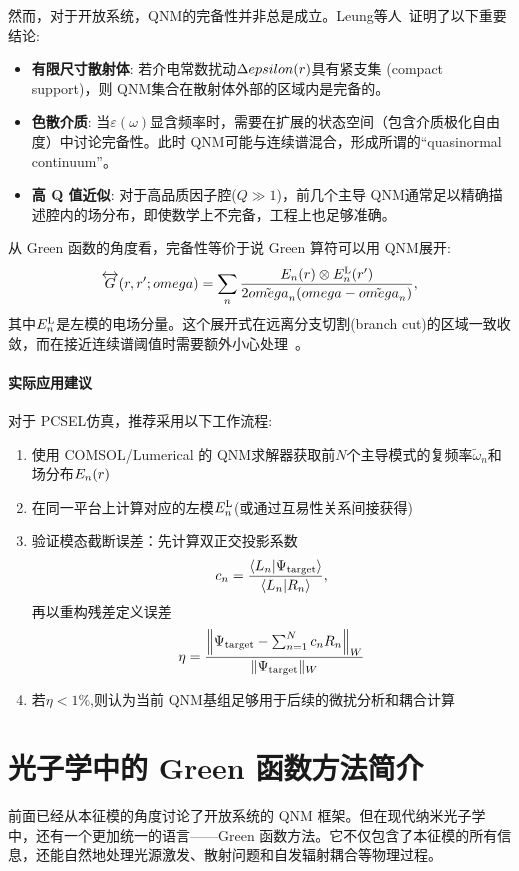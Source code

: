 然而，对于开放系统，QNM的完备性并非总是成立。Leung等人~\cite{leung1994complete}证明了以下重要结论:

\begin{itemize}
  \item \textbf{有限尺寸散射体}: 若介电常数扰动$\Delta epsilon(r)$具有紧支集 (compact support)，则 QNM集合在散射体外部的区域内是完备的。
  
  \item \textbf{色散介质}: 当$\varepsilon(\omega)$显含频率时，需要在扩展的状态空间（包含介质极化自由度）中讨论完备性。此时 QNM可能与连续谱混合，形成所谓的“quasinormal continuum”。
  
  \item \textbf{高 Q 值近似}: 对于高品质因子腔($Q\gg1$)，前几个主导 QNM通常足以精确描述腔内的场分布，即使数学上不完备，工程上也足够准确。
\end{itemize}

从 Green 函数的角度看，完备性等价于说 Green 算符可以用 QNM展开:
\begin{equation}
\overleftrightarrow{G}(r,r';omega) = \sum_n \frac{E_n(r)\otimes E_n^{\rm L}(r')}{2\tilde{omega}_n(omega-\tilde{omega}_n)},
\label{eq:green_qnm_expansion_detailed}
\end{equation}
其中$E_n^{\rm L}$是左模的电场分量。这个展开式在远离分支切割(branch cut)的区域一致收敛，而在接近连续谱阈值时需要额外小心处理~\cite{sauvan2013qnm,kristensen2015qnm}。

\paragraph{实际应用建议} 对于 PCSEL仿真，推荐采用以下工作流程:
\begin{enumerate}
  \item 使用 COMSOL/Lumerical 的 QNM求解器获取前$N$个主导模式的复频率$\tilde{\omega}_n$和场分布$E_n(r)$
  \item 在同一平台上计算对应的左模$E_n^{\rm L}$(或通过互易性关系间接获得)
  \item 验证模态截断误差：先计算双正交投影系数
  \[
  c_n=\frac{\langle L_n|\Psi_{\rm target}\rangle}{\langle L_n|R_n\rangle},
  \]
  再以重构残差定义误差
  \[
  \eta=
  \frac{\left\|\Psi_{\rm target}-\sum_{n=1}^{N} c_n R_n\right\|_{W}}
  {\|\Psi_{\rm target}\|_{W}}
  \]
  \item 若$\eta < 1\%$,则认为当前 QNM基组足够用于后续的微扰分析和耦合计算
\end{enumerate}
\section{光子学中的 Green 函数方法简介}
前面已经从本征模的角度讨论了开放系统的 QNM 框架。但在现代纳米光子学中，还有一个更加统一的语言——Green 函数方法。它不仅包含了本征模的所有信息，还能自然地处理光源激发、散射问题和自发辐射耦合等物理过程。

